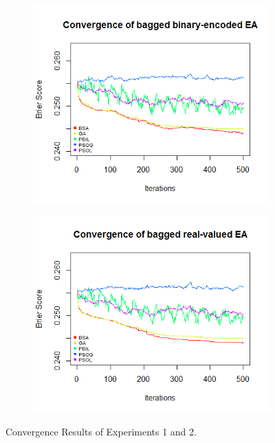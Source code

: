 \begin{figure}
	\centering
	\begin{subfigure}{.5\textwidth}
		\centering
		\includegraphics[width=\linewidth]{Conv_bin_bag}
		\label{fig:bb}
	\end{subfigure}%
	\begin{subfigure}{.5\textwidth}
		\centering
		\includegraphics[width=\linewidth]{Conv_real_bag_EA}
		\label{fig:br}
	\end{subfigure}
	\caption{Convergence Results of Experiments 1 and 2.}
	\label{fig:exp34}
\end{figure}

